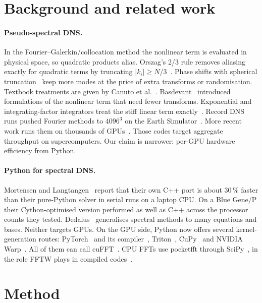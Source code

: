 \documentclass[11pt]{article}
\begin{document}
\section{Background and related work}

\paragraph{Pseudo-spectral DNS.} In the Fourier--Galerkin/collocation method the nonlinear term is
evaluated in physical space, so quadratic products alias. Orszag's 2/3 rule removes aliasing
exactly for quadratic terms by truncating $|k_i|\ge N/3$~\cite{orszag1971aliasing}. Phase shifts
with spherical truncation~\cite{patterson1971spectral,rogallo1981numerical} keep more modes at the
price of extra transforms or randomisation. Textbook treatments are given by Canuto et
al.~\cite{canuto1988spectral,canuto2006spectral}. Basdevant~\cite{basdevant1983technical}
introduced formulations of the nonlinear term that need fewer transforms. Exponential and
integrating-factor integrators treat the stiff linear term exactly~\cite{lawson1967generalized,
cox2002exponential}. Record DNS runs pushed Fourier methods to $4096^3$ on the Earth
Simulator~\cite{yokokawa2002tflops,ishihara2009study}. More recent work runs them on thousands of
GPUs~\cite{ravikumar2019gpu,yeung2025gpu}. Those codes target aggregate throughput on
supercomputers. Our claim is narrower: per-GPU hardware efficiency from Python.

\paragraph{Python for spectral DNS.} Mortensen and Langtangen~\cite{mortensen2016high} report that
their own C++ port is about 30\,\% faster than their pure-Python solver in serial runs on a
laptop CPU. On a Blue Gene/P their Cython-optimised version performed as well as C++ across the
processor counts they tested. Dedalus~\cite{burns2020dedalus}
generalises spectral methods to many equations and bases. Neither targets GPUs. On the GPU side,
Python now offers several kernel-generation routes: PyTorch~\cite{paszke2019pytorch} and its
compiler~\cite{ansel2024pytorch2}, Triton~\cite{tillet2019triton}, CuPy~\cite{okuta2017cupy}
and NVIDIA Warp~\cite{macklin2022warp}. All of them can call cuFFT~\cite{cufft}. CPU FFTs use
pocketfft through SciPy~\cite{virtanen2020scipy,harris2020array}, in the role FFTW plays in
compiled codes~\cite{frigo2005fftw}.

\section{Method}
\end{document}
